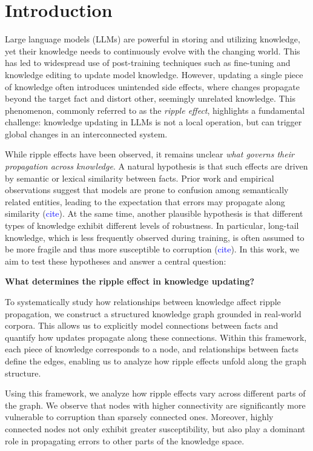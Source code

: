 \section{Introduction}

Large language models (LLMs) are powerful in storing and utilizing knowledge, yet their knowledge needs to continuously evolve with the changing world. This has led to widespread use of post-training techniques such as fine-tuning and knowledge editing to update model knowledge. However, updating a single piece of knowledge often introduces unintended side effects, where changes propagate beyond the target fact and distort other, seemingly unrelated knowledge. This phenomenon, commonly referred to as the \textit{ripple effect}, highlights a fundamental challenge: knowledge updating in LLMs is not a local operation, but can trigger global changes in an interconnected system.

While ripple effects have been observed, it remains unclear \textit{what governs their propagation across knowledge}. A natural hypothesis is that such effects are driven by semantic or lexical similarity between facts. Prior work and empirical observations suggest that models are prone to confusion among semantically related entities, leading to the expectation that errors may propagate along similarity (\textcolor{blue}{cite}). At the same time, another plausible hypothesis is that different types of knowledge exhibit different levels of robustness. In particular, long-tail knowledge, which is less frequently observed during training, is often assumed to be more fragile and thus more susceptible to corruption (\textcolor{blue}{cite}).
In this work, we aim to test these hypotheses and answer a central question:

\textbf{What determines the ripple effect in knowledge updating?}

To systematically study how relationships between knowledge affect ripple propagation, we construct a structured knowledge graph grounded in real-world corpora. This allows us to explicitly model connections between facts and quantify how updates propagate along these connections. Within this framework, each piece of knowledge corresponds to a node, and relationships between facts define the edges, enabling us to analyze how ripple effects unfold along the graph structure.

Using this framework, we analyze how ripple effects vary across different parts of the graph. 
We observe that nodes with higher connectivity are significantly more vulnerable to corruption than sparsely connected ones. 
Moreover, highly connected nodes not only exhibit greater susceptibility, but also play a dominant role in propagating errors to other parts of the knowledge space.

